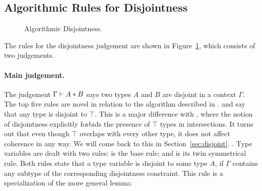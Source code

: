 \subsection{Algorithmic Rules for Disjointness}

\begin{figure}[!t]


  \caption{Algorithmic Disjointness.}
  \label{fig:disjointness}
\end{figure}

The rules for the disjointness judgement are shown in
Figure~\ref{fig:disjointness}, which consists of two judgements.
 
\paragraph{Main judgement.} The judgement $\Gamma \vdash A * B$ says
two types $A$ and $B$ are disjoint in a context $\Gamma$.
The top five rules are novel in relation to the algorithm described in \oldname.
 and  say that any type is disjoint to 
$\top$.
This is a major difference with \oldname, where the notion of disjointness explicitly forbids
the presence of $\top$ types in intersections.
It turns out that even though $\top$ overlaps with every other type,
it does not affect coherence in any way.
We will come back to this in Section~\ref{sec:disjoint}.
.  
Type variables are dealt with two rules:
 is the base rule; and 
is its twin symmetrical rule. 
Both rules state that a type variable is disjoint to some type $A$, if $\Gamma$ contains any
subtype of the corresponding disjointness constraint. 
This rule is a specialization of the more general lemma:

